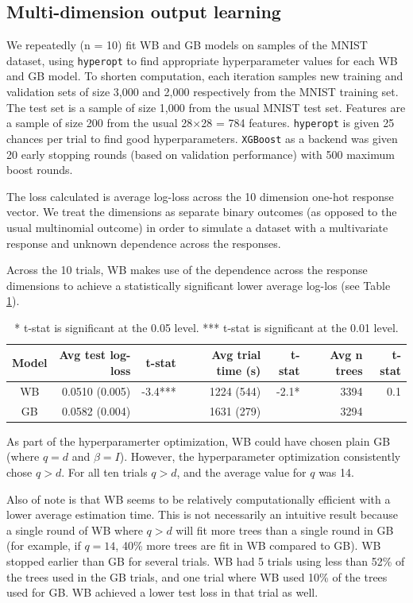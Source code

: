 \documentclass{article}
\begin{document}
\subsection{Multi-dimension output learning}
\label{ex1}
We repeatedly (n = 10) fit WB and GB models on samples of the MNIST dataset, using \texttt{hyperopt} to find appropriate hyperparameter values for each WB and GB model. To shorten computation, each iteration samples new training and validation sets of size 3{,}000 and 2{,}000 respectively from the MNIST training set. The test set is a sample of size 1{,}000 from the usual MNIST test set. Features are a sample of size 200 from the usual 28$\times$28 = 784 features. \texttt{hyperopt} is given 25 chances per trial to find good hyperparameters.  \texttt{XGBoost} as a backend was given 20 early stopping rounds (based on validation performance) with 500 maximum boost rounds.

The loss calculated is average log-loss across the 10 dimension one-hot response vector. We treat the dimensions as separate binary outcomes (as opposed to the usual multinomial outcome) in order to simulate a dataset with a multivariate response and unknown dependence across the responses.

Across the 10 trials, WB makes use of the dependence across the response dimensions to achieve a statistically significant lower average log-los (see Table \ref{tab1}).
\begin{table}[htbp]
\centering
\begin{tabular}{c|r|r|r|r|r|r}
    Model & Avg test log-loss & t-stat & Avg trial time (s) & t-stat & Avg n trees & t-stat\\
    \hline
    WB &  0.0510 (0.005) & -3.4*** & 1224 (544) & -2.1* & 3394 & 0.1\\
    GB & 0.0582 (0.004) &  &  1631 (279) &  & 3294 &  \\
\end{tabular}
\caption{* t-stat is significant at the 0.05 level. *** t-stat is significant at the 0.01 level.}
\label{tab1}
\end{table}

As part of the hyperparamerter optimization, WB could have chosen plain GB (where $q = d$ and $\beta = I$). However, the hyperparameter optimization consistently chose $q > d$. For all ten trials $q > d$, and the average value for $q$ was 14.

Also of note is that WB seems to be relatively computationally efficient with a lower average estimation time. This is not necessarily an intuitive result because a single round of WB where $q > d$ will fit more trees than a single round in GB (for example, if $q = 14$, 40\% more trees are fit in WB compared to GB). WB stopped earlier than GB for several trials. WB had 5 trials using less than 52\% of the trees used in the GB trials, and one trial where WB used 10\% of the trees used for GB. WB achieved a lower test loss in that trial as well.
\end{document}
